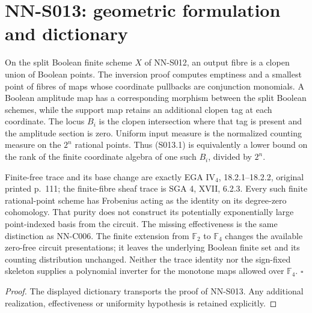\section{NN-S013: geometric formulation and dictionary}
\begin{geometricstatement}[NN-S013]
On the split Boolean finite scheme $X$ of NN-S012, an output fibre
is a clopen union of Boolean points. The inversion proof computes
emptiness and a smallest point of fibres of maps whose coordinate
pullbacks are conjunction monomials. A Boolean amplitude map has
a corresponding morphism between the split Boolean schemes, while
the support map retains an additional clopen tag at each coordinate.
The locus $B_i$ is the clopen intersection where that tag is present
and the amplitude section is zero. Uniform input measure is the
normalized counting measure on the $2^n$ rational points. Thus
(S013.1) is equivalently a lower bound on the rank of the finite
coordinate algebra of one such $B_i$, divided by $2^n$.

Finite-free trace and its base change are exactly EGA IV$_4$,
18.2.1--18.2.2, original printed p.~111; the finite-fibre sheaf trace
is SGA 4, XVII, 6.2.3. Every such finite rational-point scheme has
Frobenius acting as the identity on its degree-zero cohomology.
That purity does not construct its potentially exponentially large
point-indexed basis from the circuit. The missing effectiveness is
the same distinction as NN-C006. The finite extension from
$\mathbb F_2$ to $\mathbb F_4$ changes the available zero-free circuit
presentations; it leaves the underlying Boolean finite set and its
counting distribution unchanged. Neither the trace identity nor
the sign-fixed skeleton supplies a polynomial inverter for the
monotone maps allowed over $\mathbb F_4$.
\hfill$\square$
\end{geometricstatement}
\begin{proof} The displayed dictionary transports the proof of NN-S013. Any additional realization, effectiveness or uniformity hypothesis is retained explicitly.\end{proof}


